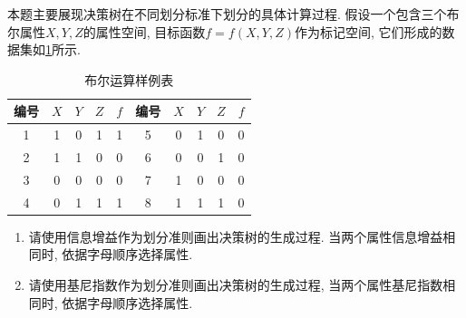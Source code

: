 \documentclass[answers]{exam}  %
\begin{document}
\begin{questions}
    本题主要展现决策树在不同划分标准下划分的具体计算过程. 假设一个包含三个布尔属性$X, Y, Z$的属性空间, 目标函数$f=f(X, Y, Z)$作为标记空间, 它们形成的数据集如\ref{ch4_tab:bool_table}所示.
    \begin{table}[ht]
        \centering
        \caption{布尔运算样例表}\label{ch4_tab:bool_table}
        \tabcolsep 15pt
        \begin{tabular}{cccc|c||cccc|c}
            \hline
            编号     & $X$ & $Y$ & $Z$ & $f$ & 编号 & $X$ & $Y$ & $Z$ & $f$ \\
            \hline 1 & 1   & 0   & 1   & 1   & 5    & 0   & 1   & 0   & 0   \\
            2        & 1   & 1   & 0   & 0   & 6    & 0   & 0   & 1   & 0   \\
            3        & 0   & 0   & 0   & 0   & 7    & 1   & 0   & 0   & 0   \\
            4        & 0   & 1   & 1   & 1   & 8    & 1   & 1   & 1   & 0   \\
            \hline
        \end{tabular}
    \end{table}
    \begin{enumerate}
        \item 请使用信息增益作为划分准则画出决策树的生成过程. 当两个属性信息增益相同时, 依据字母顺序选择属性.
        \item 请使用基尼指数作为划分准则画出决策树的生成过程, 当两个属性基尼指数相同时, 依据字母顺序选择属性.
    \end{enumerate}


\end{questions}
\end{document}
